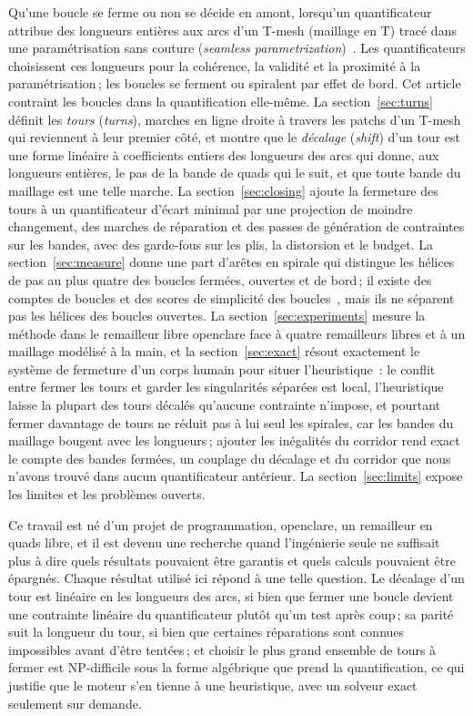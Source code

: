 \documentclass[11pt,a4paper]{article}
\begin{document}
Qu'une boucle se ferme ou non se décide en amont, lorsqu'un quantificateur
attribue des longueurs entières aux arcs d'un T-mesh (maillage en T) tracé
dans une paramétrisation sans couture (\emph{seamless
parametrization})~\cite{campen2015qgp,lyon2021constrained,heistermann2023bimdf}.
Les quantificateurs choisissent ces longueurs pour la cohérence, la validité
et la proximité à la paramétrisation\,; les boucles se ferment ou spiralent
par effet de bord. Cet article contraint les boucles dans la quantification
elle-même. La section~\ref{sec:turns} définit les \emph{tours}
(\emph{turns}), marches en ligne droite à travers les patchs d'un T-mesh qui
reviennent à leur premier côté, et montre que le \emph{décalage}
(\emph{shift}) d'un tour est une forme linéaire à coefficients entiers des
longueurs des arcs qui donne, aux longueurs entières, le pas de la bande de
quads qui le suit, et que toute bande du maillage est une telle marche. La
section~\ref{sec:closing} ajoute la fermeture des tours à un quantificateur
d'écart minimal par une projection de moindre changement, des marches de
réparation et des passes de génération de contraintes sur les bandes, avec
des garde-fous sur les plis, la distorsion et le budget. La
section~\ref{sec:measure} donne une part d'arêtes en spirale qui distingue
les hélices de pas au plus quatre des boucles fermées, ouvertes et de
bord\,; il existe des comptes de boucles et des scores de simplicité des
boucles~\cite{liu2025quadgpt,kong2026squadgen}, mais ils ne séparent pas les
hélices des boucles ouvertes. La section~\ref{sec:experiments} mesure la
méthode dans le remailleur libre openclare face à quatre remailleurs libres et
à un maillage modélisé à la main, et la section~\ref{sec:exact} résout
exactement le système de fermeture d'un corps humain pour situer
l'heuristique~: le conflit entre fermer les tours et garder les singularités
séparées est local, l'heuristique laisse la plupart des tours décalés
qu'aucune contrainte n'impose, et pourtant fermer davantage de tours ne
réduit pas à lui seul les spirales, car les bandes du maillage bougent avec
les longueurs\,; ajouter les inégalités du corridor rend exact le compte des
bandes fermées, un couplage du décalage et du corridor que nous n'avons trouvé
dans aucun quantificateur antérieur. La section~\ref{sec:limits} expose les limites et les
problèmes ouverts.

Ce travail est né d'un projet de programmation, openclare, un remailleur en
quads libre, et il est devenu une recherche quand l'ingénierie seule ne
suffisait plus à dire quels résultats pouvaient être garantis et quels
calculs pouvaient être épargnés. Chaque résultat utilisé ici répond à une
telle question. Le décalage d'un tour est linéaire en les longueurs des
arcs, si bien que fermer une boucle devient une contrainte linéaire du
quantificateur plutôt qu'un test après coup\,; sa parité suit la longueur
du tour, si bien que certaines réparations sont connues impossibles avant
d'être tentées\,; et choisir le plus grand ensemble de tours à fermer est
NP-difficile sous la forme algébrique que prend la quantification, ce qui justifie que le moteur s'en tienne à une heuristique,
avec un solveur exact seulement sur demande.
\end{document}
